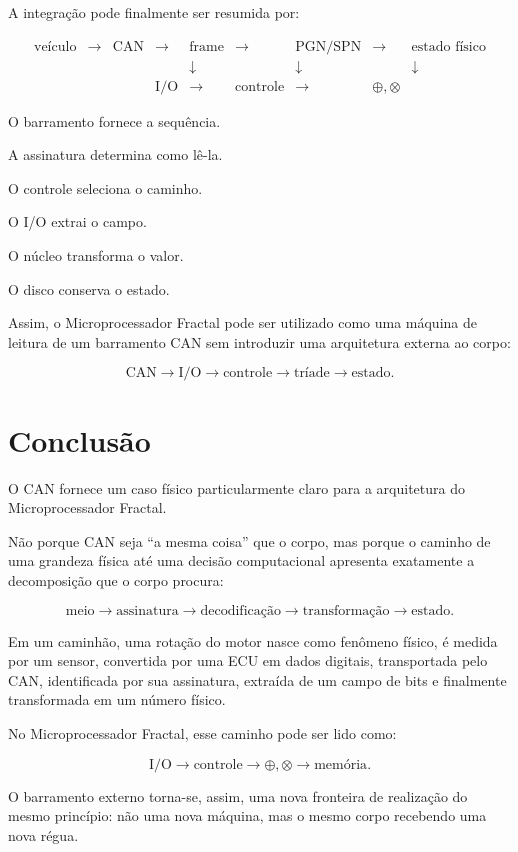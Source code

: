 \documentclass[11pt,a4paper]{article}
\begin{document}
A integração pode finalmente ser resumida por:

\[
\boxed{
\begin{array}{ccccccccc}
\text{veículo}
&\rightarrow&
\text{CAN}
&\rightarrow&
\text{frame}
&\rightarrow&
\text{PGN/SPN}
&\rightarrow&
\text{estado físico}
\\
&&&&
\downarrow
&&
\downarrow
&&
\downarrow
\\
&&&
\text{I/O}
&
\rightarrow
&
\text{controle}
&
\rightarrow
&
\oplus,\otimes
\end{array}
}
\]

O barramento fornece a sequência.

A assinatura determina como lê-la.

O controle seleciona o caminho.

O I/O extrai o campo.

O núcleo transforma o valor.

O disco conserva o estado.

Assim, o Microprocessador Fractal pode ser utilizado como uma máquina de leitura de
um barramento CAN sem introduzir uma arquitetura externa ao corpo:

\[
\boxed{
\text{CAN}
\rightarrow
\text{I/O}
\rightarrow
\text{controle}
\rightarrow
\text{tríade}
\rightarrow
\text{estado}.
}
\]


\section{Conclusão}

O CAN fornece um caso físico particularmente claro para a arquitetura do
Microprocessador Fractal.

Não porque CAN seja ``a mesma coisa'' que o corpo, mas porque o caminho de uma
grandeza física até uma decisão computacional apresenta exatamente a decomposição
que o corpo procura:

\[
\text{meio}
\rightarrow
\text{assinatura}
\rightarrow
\text{decodificação}
\rightarrow
\text{transformação}
\rightarrow
\text{estado}.
\]

Em um caminhão, uma rotação do motor nasce como fenômeno físico, é medida por um
sensor, convertida por uma ECU em dados digitais, transportada pelo CAN, identificada
por sua assinatura, extraída de um campo de bits e finalmente transformada em um
número físico.

No Microprocessador Fractal, esse caminho pode ser lido como:

\[
\boxed{
\text{I/O}
\rightarrow
\text{controle}
\rightarrow
\oplus,\otimes
\rightarrow
\text{memória}.
}
\]

O barramento externo torna-se, assim, uma nova fronteira de realização do mesmo
princípio: não uma nova máquina, mas o mesmo corpo recebendo uma nova régua.
\end{document}
